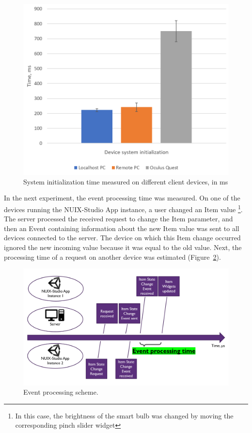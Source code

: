 \begin{figure}
  \centering
  \includegraphics[width=0.9\linewidth]{figures/SystemInitTime.png}
  \caption{System initialization time measured on different client devices, in ms}
  \label{fig:SystemInitTime-figure}
\end{figure}

In the next experiment, the event processing time was measured. On one of the devices running the NUIX-Studio App instance, a user changed an Item value \footnote{In this case, the brightness of the smart bulb was changed by moving the corresponding pinch slider widget}. The server processed the received request to change the Item parameter, and then an Event containing information about the new Item value was sent to all devices connected to the server. The device on which this Item change occurred ignored the new incoming value because it was equal to the old value. Next, the processing time of a request on another device was estimated (Figure~\ref{fig:EventProcessingScheme-figure}).

\begin{figure}
  \centering
  \includegraphics[width = 0.9 \linewidth]{figures/EventProcessingScheme.png}
  \caption{Event processing scheme.}
  \label{fig:EventProcessingScheme-figure}
\end{figure}

